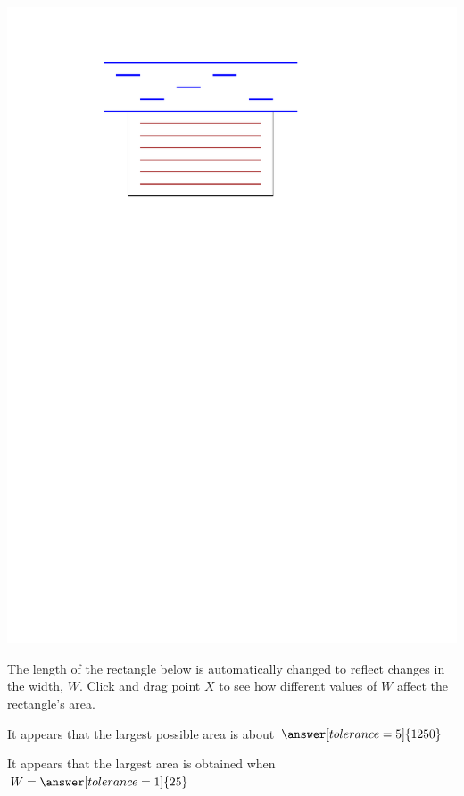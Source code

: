 \documentclass{ximera}
\begin{document}
\begin{image}
\includegraphics[scale=0.5]{GardenFig}
\end{image}

\begin{exploration}
The length of the rectangle below is automatically changed to reflect changes in the width, $W$. Click and drag point $X$ to see how different values of $W$ affect the rectangle's area.


\begin{problem}
It appears that the largest possible area is about $\answer[tolerance=5]{1250}$
\end{problem}

\begin{problem}
It appears that the largest area is obtained when $W = \answer[tolerance=1]{25}$
\end{problem}
\end{exploration}
\end{document}
